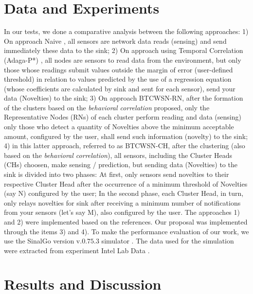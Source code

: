 \documentclass[conference]{IEEEtran}
\begin{document}
\section{Data and Experiments}
\label{Data and Experiments}
In our tests, we done a comparative analysis between the following approaches:
1) On approach Naive \cite{Madden2005}, all sensors are network data reads
(sensing) and send immediately these data to the sink; 2) On approach using
Temporal Correlation (Adaga-P*) \cite{MaiaSAC2013}, all nodes are sensors to
read data from the environment, but only those whose readings submit values
outside the margin of error (user-defined threshold) in relation to values
predicted by the use of a regression equation (whose coefficients are calculated
by sink and sent for each sensor), send your data (Novelties) to the sink; 3) On
approach BTCWSN-RN, after the formation of the clusters based on the
\textit{behavioral correlation} proposed, only the Representative Nodes (RNs) of
each cluster perform reading and data (sensing) only those who detect a quantity
of Novelties above the minimum acceptable amount, configured by the user, shall
send such information (novelty) to the sink; 4) in this latter approach,
referred to as BTCWSN-CH, after the clustering (also based on the
\textit{behavioral correlation}), all sensors, including the Cluster Heads (CHs)
choosen, make sensing / prediction, but sending data (Novelties) to the sink is
divided into two phases: At first, only sensors send novelties to their
respective Cluster Head after the occurrence of a minimum threshold of Novelties
(say N) configured by the user; In the second phase, each Cluster Head, in turn,
only relays novelties for sink after receiving a minimum number of notifications
from your sensors (let's say M), also configured by the user.
The approaches 1) and 2) were implemented based on the references. Our proposal
was implemented through the items 3) and 4).
To make the performance evaluation of our work, we use the SinalGo version
v.$0.75.3$ simulator \cite{Sinalgo2007}. The data used for the simulation were
extracted from experiment Intel Lab Data \cite{Intel2004}.

\section{Results and Discussion}
\end{document}
